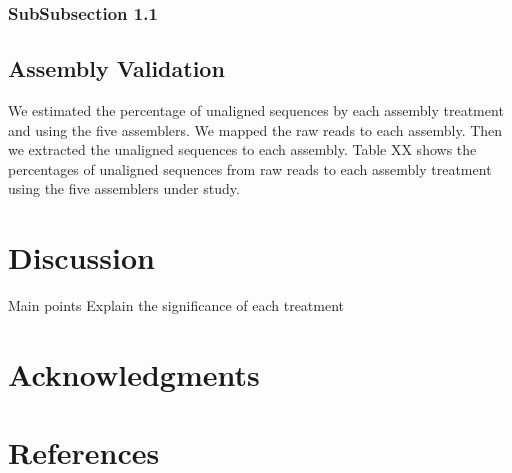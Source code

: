 

\subsubsection*{SubSubsection 1.1}

\subsection*{Assembly Validation}

We estimated the percentage of unaligned sequences  by each assembly treatment and using the five assemblers. We mapped the raw reads to each assembly. Then we extracted the unaligned sequences to each assembly. 
Table XX shows the percentages of unaligned sequences from raw reads to each assembly treatment using the five assemblers under study. 


\section*{Discussion}
Main points
Explain the significance of each treatment
 
 
  

\section*{Acknowledgments}


\section*{References}

%
%
% 



